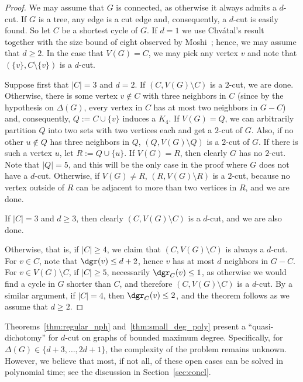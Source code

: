 \begin{proof}
    We may assume that $G$ is connected, as otherwise it always admits a $d$-cut. If $G$ is a tree, any edge is a cut edge and, consequently, a $d$-cut is easily found.
    So let $C$ be a shortest cycle of $G$.
    If $d = 1$ we use Chvátal's result~\cite{chvatal_matching_cut} together with the size bound of eight observed by Moshi~\cite{matching_cut_moshi}; hence, we may assume that $d \geq 2$.
    In the case that $V(G) = C$, we may pick any vertex $v$ and note that $(\{v\}, C \setminus \{v\})$ is a $d$-cut.


     Suppose first that $|C| = 3$ and $d = 2$.  If $(C, V(G) \setminus C)$ is a $2$-cut, we are done. Otherwise, there is some vertex $v \notin C$ with three neighbors in $C$ (since by the hypothesis on $\Delta(G)$, every vertex in $C$ has at most two neighbors in $G - C$) and, consequently, $Q := C \cup \{v\}$ induces a $K_4$.
    If $V(G) = Q$, we can arbitrarily partition $Q$ into two sets with two vertices each and get a $2$-cut of $G$.
    Also, if no other $u \notin Q$ has three neighbors in $Q$, $(Q, V(G) \setminus Q)$ is a $2$-cut of $G$.
    If there is such a vertex $u$, let $R := Q \cup \{u\}$. If $V(G) = R$, then clearly $G$ has no $2$-cut. Note that $|Q|=5$, and this will be the only case in the proof where $G$ does not have a $d$-cut. Otherwise, if $V(G) \neq R$, $(R, V(G) \setminus R)$ is a $2$-cut, because no vertex outside of $R$ can be adjacent to more than two vertices in $R$, and we are done.

    If $|C| = 3$ and $d \geq 3$, then clearly $(C, V(G) \setminus C)$ is a $d$-cut, and we are also done.

    Otherwise, that is, if $|C| \geq 4$, we claim that $(C, V(G) \setminus C)$ is always a $d$-cut.
    For $v \in C$, note that $\dgr(v) \leq d + 2$, hence $v$ has at most $d$ neighbors in $G - C$. For $v \in V(G) \setminus C$, if $|C| \geq 5$, necessarily $\dgr_C(v) \leq 1$, as otherwise we would find a cycle in $G$ shorter than $C$, and therefore $(C, V(G) \setminus C)$ is a $d$-cut.
    By a similar argument, if $|C| = 4$, then $\dgr_C(v) \leq 2$, and the theorem follows as we assume that $d \geq 2$.
\end{proof}

Theorems~\ref{thm:regular_nph} and~\ref{thm:small_deg_poly} present a ``quasi-dichotomy'' for $d$-cut on graphs of bounded maximum degree.
Specifically, for $\Delta(G) \in \{d+3, \dots, 2d+1\}$, the complexity of the problem remains unknown.
However, we believe that most, if not all, of these open cases can be solved in polynomial time; see the discussion in Section~\ref{sec:concl}.


